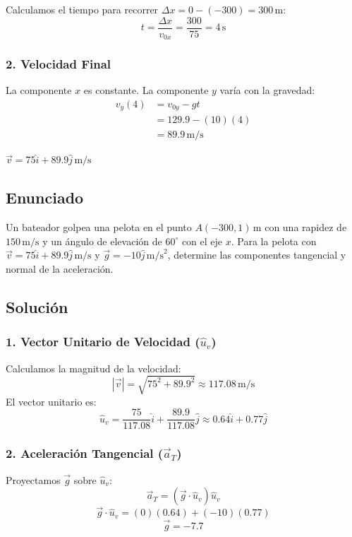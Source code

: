 \documentclass[12pt, a4paper]{article}
\begin{document}
Calculamos el tiempo para recorrer $\Delta x = 0 - (-300) = 300 \, \text{m}$:
$$ t = \frac{\Delta x}{v_{0x}} = \frac{300}{75} = 4 \, \text{s} $$

\subsubsection*{2. Velocidad Final}
La componente $x$ es constante. La componente $y$ varía con la gravedad:
\begin{align*}
    v_y(4) &= v_{0y} - gt \\
    &= 129.9 - (10)(4) \\
    &= 89.9 \, \text{m/s}
\end{align*}

\begin{tcolorbox}[colback=blue!5!white, colframe=blue!75!black, title=Respuesta Final]
\centering
$\vec{v} = 75\hat{i} + 89.9\hat{j} \, \text{m/s}$
\end{tcolorbox}

\newpage

\subsection*{Enunciado}
Un bateador golpea una pelota en el punto $A(-300, 1) \, \text{m}$ con una rapidez de $150 \, \text{m/s}$ y un ángulo de elevación de $60^\circ$ con el eje $x$. Para la pelota con $\vec{v} = 75\hat{i} + 89.9\hat{j} \, \text{m/s}$ y $\vec{g} = -10\hat{j} \, \text{m/s}^2$, determine las componentes tangencial y normal de la aceleración.

\subsection*{Solución}

\subsubsection*{1. Vector Unitario de Velocidad ($\hat{u}_v$)}
Calculamos la magnitud de la velocidad:
$$ |\vec{v}| = \sqrt{75^2 + 89.9^2} \approx 117.08 \, \text{m/s} $$
El vector unitario es:
$$ \hat{u}_v = \frac{75}{117.08}\hat{i} + \frac{89.9}{117.08}\hat{j} \approx 0.64\hat{i} + 0.77\hat{j} $$

\subsubsection*{2. Aceleración Tangencial ($\vec{a}_T$)}
Proyectamos $\vec{g}$ sobre $\hat{u}_v$:
$$ \vec{a}_T = (\vec{g} \cdot \hat{u}_v) \hat{u}_v $$
$$ \vec{g} \cdot \hat{u}_v = (0)(0.64) + (-10)(0.77)$$
$$ \vec{g}= -7.7 $$
\end{document}
